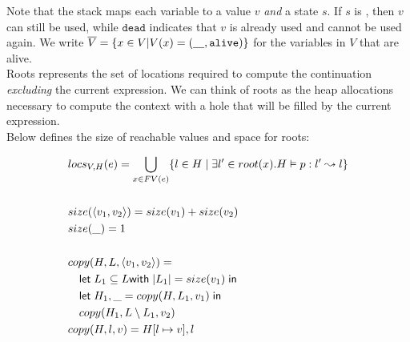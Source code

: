 \documentclass[11pt]{article}
\newcommand{\irl}[1]{\mathtt{#1}}
\begin{document}
\noindent
Note that the stack maps each variable to a value $v$ \emph{and} a state $s$. If $s$ is \irl{alive}, then $v$ can still be used, while $\irl{dead}$ indicates that $v$ is already used and cannot be used again. We write $\overline V = \{x \in V | V(x) = (\underline{\hspace{10px}},\irl{alive}) \}$ for the variables in $V$ that are alive.\\ 

\noindent
Roots represents the set of locations required to compute the continuation \emph{excluding} the current expression.
We can think of roots as the heap allocations necessary to compute the context with a hole that will be filled
by the current expression.\\


\noindent
Below defines the size of reachable values and space for roots:

\begin{align*}
  &locs_{V,H}(e) = \bigcup\limits_{x \in FV(e)} \{l \in H \mid \exists l' \in root(x). H \vDash p : l' \leadsto l\}\\\\
  &size(\langle v_1, v_2\rangle) = size(v_1) + size(v_2)\\
  &size(\_) = 1\\\\
  &copy(H,L,\langle v_1, v_2\rangle) =\\
  &\quad\mathsf{let }\; L_1 \subseteq L \mathsf{ with }\; |L_1| = size(v_1) \;\mathsf{ in}\\
  &\quad\mathsf{let }\; H_1,\_ = copy(H,L_1,v_1) \;\mathsf{ in} \\
  &\quad copy(H_1,L \setminus L_1, v_2)\\
  &copy(H,l,v) = H[l \mapsto v], l\\
\end{align*}
\end{document}
